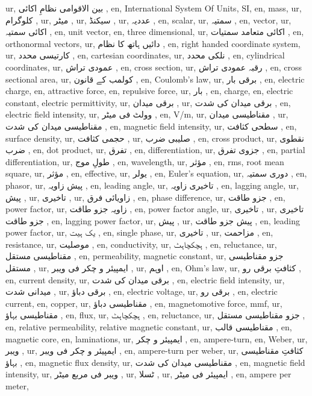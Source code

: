 ur, بین الاقوامی نظامِ اکائی ,
en, International System Of Units, SI,
en, mass,
ur, کلوگرام ,
ur, میٹر ,
ur, سیکنڈ ,
ur, عددیہ ,
en, scalar,
ur, سمتیہ ,
en, vector,
ur, اکائی سمتیہ ,
en, unit vector,
en, three dimensional,
ur, اکائی متعامد سمتیات ,
en, orthonormal vectors,
ur, دائیں ہاتھ کا نظام ,
en, right handed coordinate system,
ur, کارتیسی محدد ,
en, cartesian coordinates,
ur, نلکی محدد ,
en, cylindrical coordinates,
ur, عمودی تراش ,
en, cross section,
ur, رقبہ عمودی تراش ,
en, cross sectional area,
ur, کولمب کے قانون ,
en, Coulomb's law,
ur, برقی بار ,
en, electric charge,
en, attractive force,
en, repulsive force,
ur, بار ,
en, charge,
en, electric constant, electric permittivity,
ur, برقی میدان ,
ur, برقی میدان کی شدت ,
en, electric field intensity,
ur, وولٹ فی میٹر ,
en, \si {\volt / \meter },
ur, مقناطیسی میدان ,
ur, مقناطیسی میدان کی شدت ,
en, magnetic field intensity,
ur, سطحی کثافت ,
en, surface density,
ur, حجمی کثافت ,
ur, صلیبی ضرب ,
en, cross product,
ur, نقطوی ضرب ,
en, dot product,
ur, تفرق ,
en, differentiation,
ur, جزوی تفرق ,
en, partial differentiation,
ur, طولِ موج ,
en, wavelength,
ur, مؤثر ,
en, rms, root mean square,
ur, مؤثر ,
en, effective,
ur, یولر ,
en, Euler's equation,
ur, دوری سمتیہ ,
en, phasor,
ur, پیش زاویہ ,
en, leading angle,
ur, تاخیری زاویہ ,
en, lagging angle,
ur, پیش ,
ur, تاخیری ,
ur,  زاویائی فرق ,
en, phase difference,
ur, جزو طاقت ,
en, power factor,
ur, زاویہ جزو طاقت ,
en, power factor angle,
ur, تاخیری ,
ur, تاخیری جزو طاقت ,
en, lagging power factor,
ur, پیش ,
ur, پیش جزو طاقت ,
en, leading power factor,
ur, یک ہیت ,
en, single phase,
ur, تاخیری ,
ur, مزاحمت ,
en, resistance,
ur, موصلیت ,
en, conductivity,
ur, ہچکچاہٹ ,
en, reluctance,
ur, مقناطیسی مستقل ,
en, permeability, magnetic constant,
ur, جزو مقناطیسی مستقل ,
ur, ایمپیئر و چکر فی ویبر ,
ur, اوہم ,
en, Ohm's law,
ur, کثافتِ برقی رو ,
en, current density,
ur, برقی میدان کی شدت ,
en, electric field intensity,
ur, میدانی شدت ,
ur, برقی دباؤ ,
en, electric voltage,
ur, برقی رو ,
en, electric current,
en, copper,
ur, مقناطیسی دباؤ ,
en, magnetomotive force, mmf,
ur, مقناطیسی بہاؤ ,
en, flux,
ur, ہچکچاہٹ ,
en, reluctance,
ur, جزو مقناطیسی مستقل ,
en, relative permeability, relative magnetic constant,
ur, مقناطیسی قالب ,
en, magnetic core,
en, laminations,
ur, ایمپیئر و چکر ,
en, ampere-turn,
en, Weber,
ur, ویبر ,
ur, ایمپیئر و چکر فی ویبر ,
en, ampere-turn per weber,
ur, کثافتِ مقناطیسی بہاؤ ,
en, magnetic flux density,
ur, مقناطیسی میدان کی شدت ,
en, magnetic field intensity,
ur, ویبر فی مربع میٹر ,
ur, ٹسلا ,
ur, ایمپیئر فی میٹر ,
en, ampere per meter,
